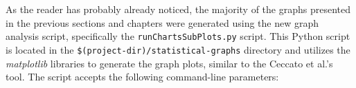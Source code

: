 	

\bigskip
As the reader has probably already noticed, the majority of the graphs presented in the previous sections and chapters were generated using the new graph analysis script, specifically the \texttt{runChartsSubPlots.py} script. This Python script is located in the \texttt{\$(project-dir)/statistical-graphs} directory and utilizes the \textit{matplotlib} libraries to generate the graph plots, similar to the Ceccato et al.'s tool.\newline 
The script accepts the following command-line parameters:

